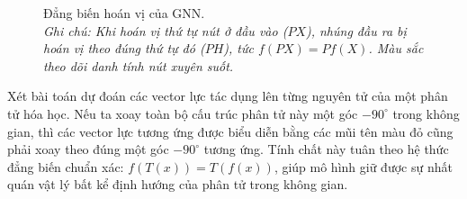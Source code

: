 \begin{figure}[H]
\caption[Đẳng biến hoán vị của GNN]{Đẳng biến hoán vị của GNN.\protect\\[2pt]
\textit{Ghi chú: Khi hoán vị thứ tự nút ở đầu vào ($PX$), nhúng đầu ra bị hoán vị theo đúng thứ tự đó ($PH$), tức $f(PX)=P f(X)$. Màu sắc theo dõi danh tính nút xuyên suốt.}}
\label{fig:equiv-node}
\end{figure}
 
\begin{example}
\label{vd:molecule-equivariance}
Xét bài toán dự đoán các vector lực tác dụng lên từng nguyên tử của một phân tử hóa học. Nếu ta xoay toàn bộ cấu trúc phân tử này một góc $-90^\circ$ trong không gian, thì các vector lực tương ứng được biểu diễn bằng các mũi tên màu đỏ cũng phải xoay theo đúng một góc $-90^\circ$ tương ứng. Tính chất này tuân theo hệ thức đẳng biến chuẩn xác: $f(T(x)) = T(f(x))$, giúp mô hình giữ được sự nhất quán vật lý bất kể định hướng của phân tử trong không gian.
\end{example}



